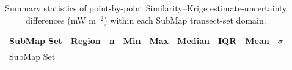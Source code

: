 \documentclass[final]{agujournal2019}
\begin{document}
\begin{longtable}[]{@{}
  >{\raggedright\arraybackslash}p{}
  >{\raggedleft\arraybackslash}p{}
  >{\raggedleft\arraybackslash}p{}
  >{\raggedleft\arraybackslash}p{}
  >{\raggedleft\arraybackslash}p{}
  >{\raggedleft\arraybackslash}p{}
  >{\raggedleft\arraybackslash}p{}
  >{\raggedleft\arraybackslash}p{}
  >{\raggedleft\arraybackslash}p{}@{}}
\caption{Summary statistics of point-by-point Similarity--Krige
estimate-uncertainty differences (mW m\(^{-2}\)) within each SubMap
transect-set domain.}\label{tbl:sigma-diff-summary}\tabularnewline
\toprule\noalign{}
\begin{minipage}[b]{\linewidth}\raggedright
SubMap Set
\end{minipage} & \begin{minipage}[b]{\linewidth}\raggedleft
Region
\end{minipage} & \begin{minipage}[b]{\linewidth}\raggedleft
n
\end{minipage} & \begin{minipage}[b]{\linewidth}\raggedleft
Min
\end{minipage} & \begin{minipage}[b]{\linewidth}\raggedleft
Max
\end{minipage} & \begin{minipage}[b]{\linewidth}\raggedleft
Median
\end{minipage} & \begin{minipage}[b]{\linewidth}\raggedleft
IQR
\end{minipage} & \begin{minipage}[b]{\linewidth}\raggedleft
Mean
\end{minipage} & \begin{minipage}[b]{\linewidth}\raggedleft
\(\sigma\)
\end{minipage} \\
\midrule\noalign{}
\endfirsthead
\toprule\noalign{}
\begin{minipage}[b]{\linewidth}\raggedright
SubMap Set
\end{minipage} & \begin{minipage}[b]{\linewidth}\raggedleft

\end{minipage}
\end{longtable}
\end{document}
